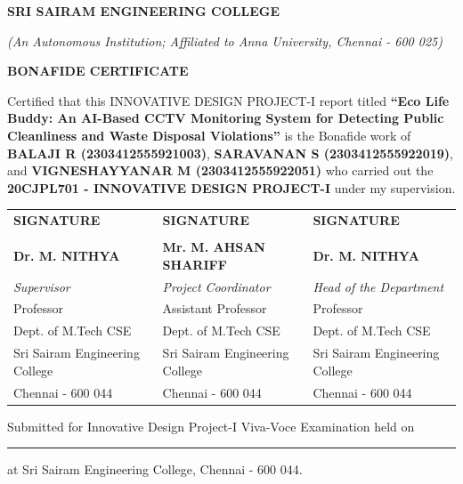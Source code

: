 \documentclass[12pt,a4paper]{report}
\begin{document}
\newpage
\thispagestyle{empty}
\begin{center}
{\large \textbf{SRI SAIRAM ENGINEERING COLLEGE}}\par
\textit{(An Autonomous Institution; Affiliated to Anna University, Chennai - 600 025)}\par
\vspace{1.2cm}
{\Large \textbf{BONAFIDE CERTIFICATE}}\par
\end{center}

\vspace{0.8cm}
Certified that this INNOVATIVE DESIGN PROJECT-I report titled \textbf{``Eco Life Buddy: An AI-Based CCTV Monitoring System for Detecting Public Cleanliness and Waste Disposal Violations''} is the Bonafide work of \textbf{BALAJI R (2303412555921003)}, \textbf{SARAVANAN S (2303412555922019)}, and \textbf{VIGNESHAYYANAR M (2303412555922051)} who carried out the \textbf{20CJPL701 - INNOVATIVE DESIGN PROJECT-I} under my supervision.

\vspace{2.5cm}

\noindent
\begin{tabular}{p{4.5cm}p{4.5cm}p{4.5cm}}
\centering\textbf{SIGNATURE} & \centering\textbf{SIGNATURE} & \centering\textbf{SIGNATURE} \tabularnewline
\vspace{0.2cm} & \vspace{0.2cm} & \vspace{0.2cm} \tabularnewline
\textbf{Dr. M. NITHYA} & \textbf{Mr. M. AHSAN SHARIFF} & \textbf{Dr. M. NITHYA} \tabularnewline
\textit{Supervisor} & \textit{Project Coordinator} & \textit{Head of the Department} \tabularnewline
Professor & Assistant Professor & Professor \tabularnewline
Dept. of M.Tech CSE & Dept. of M.Tech CSE & Dept. of M.Tech CSE \tabularnewline
Sri Sairam Engineering College & Sri Sairam Engineering College & Sri Sairam Engineering College \tabularnewline
Chennai - 600 044 & Chennai - 600 044 & Chennai - 600 044 \tabularnewline
\end{tabular}

\vspace{2.0cm}
\noindent
Submitted for Innovative Design Project-I Viva-Voce Examination held on \rule{4cm}{0.4pt} at Sri Sairam Engineering College, Chennai - 600 044.
\end{document}
